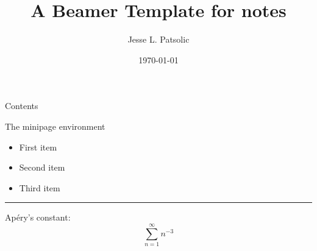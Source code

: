 \documentclass[xcolor=dvipsnames, aspectratio=169]{beamer}
\title[Daily Notes]{A Beamer Template for notes}
\subtitle[]{}
\author[JLP]{Jesse L. Patsolic}
\institute[JLP]{\texttt{[image: logoWhite.png]}}
\institute[JLP]{\texttt{[image: logoBig.png]}}
\date[]{\today}
\begin{document}
\begin{frame}
\titlepage
\end{frame}
\begin{frame}{Contents}
\tableofcontents
\end{frame}

\begin{frame}{The minipage environment}
\begin{minipage}{0.47\textwidth}
    \begin{itemize}
        \item First item
        \item Second item
        \item Third item
    \end{itemize}
\end{minipage}
\begin{minipage}{0.5\textwidth}
    \rule{\textwidth}{0.75\textwidth}
\end{minipage}
\end{frame}


\begin{frame}{}
Ap\'ery's constant:
\[
  \sum_{n=1}^{\infty}{n^{-3}}
\]
\end{frame}


\begin{frame}[plain]

\end{frame}
\end{document}

